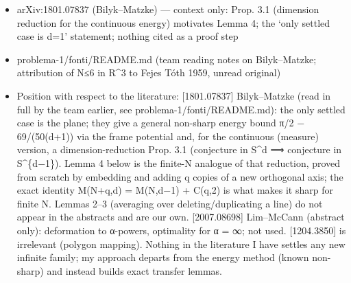 \begin{itemize}
\tightlist
\item
  arXiv:1801.07837 (Bilyk--Matzke) --- context only: Prop. 3.1
  (dimension reduction for the continuous energy) motivates Lemma 4; the
  `only settled case is d=1' statement; nothing cited as a proof step
\item
  problema-1/fonti/README.md (team reading notes on Bilyk--Matzke;
  attribution of N≤6 in R\^{}3 to Fejes Tóth 1959, unread original)
\item
  Position with respect to the literature: {[}1801.07837{]}
  Bilyk--Matzke (read in full by the team earlier, see
  problema-1/fonti/README.md): the only settled case is the plane; they
  give a general non-sharp energy bound π/2 − 69/(50(d+1)) via the frame
  potential and, for the continuous (measure) version, a
  dimension-reduction Prop. 3.1 (conjecture in S\^{}d ⟹ conjecture in
  S\^{}\{d−1\}). Lemma 4 below is the finite-N analogue of that
  reduction, proved from scratch by embedding and adding q copies of a
  new orthogonal axis; the exact identity M(N+q,d) = M(N,d−1) + C(q,2)
  is what makes it sharp for finite N. Lemmas 2--3 (averaging over
  deleting/duplicating a line) do not appear in the abstracts and are
  our own. {[}2007.08698{]} Lim--McCann (abstract only): deformation to
  α-powers, optimality for α = ∞; not used. {[}1204.3850{]} is
  irrelevant (polygon mapping). Nothing in the literature I have settles
  any new infinite family; my approach departs from the energy method
  (known non-sharp) and instead builds exact transfer lemmas.
\end{itemize}


